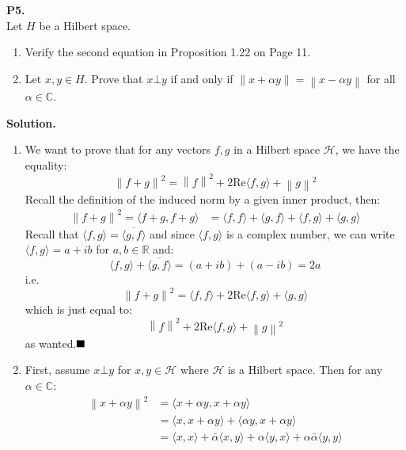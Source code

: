\documentclass{article}
\newcommand{\norm}[1]{\left\lVert#1\right\rVert}
\begin{document}
    \textbf{P5.}\\

    Let $H$ be a Hilbert space.
    \begin{enumerate}
        \item Verify the second equation in Proposition 1.22 on Page 11.
        \item Let $x,y\in H$. Prove that $x\bot y$ if and only if $\norm{x+\alpha y} = \norm{x-\alpha y}$ for all $\alpha\in\mathbb{C}$.
    \end{enumerate}

    \textbf{Solution.}

    \begin{enumerate}
        \item We want to prove that for any vectors $f,g$ in a Hilbert space $\mathcal{H}$, we have the equality:
            \[ \norm{f+g}^2 = \norm{f}^2 + 2\text{Re}\langle f,g \rangle + \norm{g}^2\]
            Recall the definition of the induced norm by a given inner product, then:
            \begin{align*}
                \norm{f+g}^2 = \langle f+g, f+g \rangle &=
                    \langle f,f\rangle + \langle g,f\rangle + \langle f,g\rangle + \langle g,g\rangle
            \end{align*}
            Recall that $\langle f,g\rangle = \overline{\langle g,f\rangle}$ and since $\langle f,g\rangle$ is a complex number, 
            we can write
            $\langle f,g\rangle = a+ib$ for $a,b\in\mathbb{R}$ and:
            \[ \langle f,g\rangle + \overline{\langle g,f\rangle} = (a+ib) + (a-ib) = 2a \]
            i.e.
            \[ \norm{f+g}^2 = \langle f,f\rangle + 2\text{Re}\langle f,g\rangle + \langle g,g\rangle \]
            which is just equal to:
            \[ \norm{f}^2 + 2\text{Re}\langle f,g\rangle + \norm{g}^2 \]
            as wanted.$\hfill\blacksquare$
        \item First, assume $x\bot y$ for $x,y\in\mathcal{H}$ where $\mathcal{H}$ is a Hilbert space. Then for any $\alpha\in\mathbb{C}$:
            \begin{align*}
                \norm{x+\alpha y}^2 &= \langle x+\alpha y, x+\alpha y\rangle \\
                &= \langle x,x+\alpha y\rangle + \langle \alpha y,x+\alpha y\rangle \\
                &= \langle x,x\rangle + \bar{\alpha}\langle x,y\rangle + \alpha\langle y,x\rangle+\alpha\bar{\alpha}\langle y,y\rangle\\
            \end{align*}

\end{enumerate}
\end{document}
